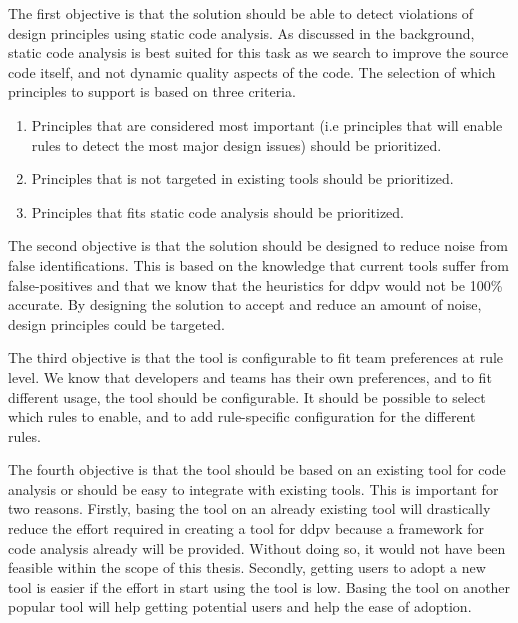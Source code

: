 \documentclass[pdftex,10pt,b5paper,twoside]{report}
\begin{document}
The first objective is that the solution should be able to detect violations of design principles using static code analysis. As discussed in the background, static code analysis is best suited for this task as we search to improve the source code itself, and not dynamic quality aspects of the code. The selection of which principles to support is based on three criteria. 

\begin{enumerate}
    \item Principles that are considered most important (i.e principles that will enable rules to detect the most major design issues) should be prioritized.
    
    \item Principles that is not targeted in existing tools should be prioritized.
    
    \item Principles that fits static code analysis should be prioritized.
\end{enumerate}

The second objective is that the solution should be designed to reduce noise from false identifications. This is based on the knowledge that current tools suffer from false-positives and that we know that the heuristics for \gls{ddpv} would not be 100\% accurate. By designing the solution to accept and reduce an amount of noise, design principles could be targeted.

The third objective is that the tool is configurable to fit team preferences at rule level. We know that developers and teams has their own preferences, and to fit different usage, the tool should be configurable. It should be possible to select which rules to enable, and to add rule-specific configuration for the different rules.

The fourth objective is that the tool should be based on an existing tool for code analysis or should be easy to integrate with existing tools. This is important for two reasons. Firstly, basing the tool on an already existing tool will drastically reduce the effort required in creating a tool for \gls{ddpv} because a framework for code analysis already will be provided. Without doing so, it would not have been feasible within the scope of this thesis. Secondly, getting users to adopt a new tool is easier if the effort in start using the tool is low. Basing the tool on another popular tool will help getting potential users and help the ease of adoption.
\end{document}
